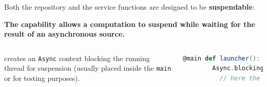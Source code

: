 \documentclass[aspectratio=1610,xcolor=dvipsnames,handout]{beamer}
\begin{document}
\begin{frame}[fragile] %
  \small
  Both the repository and the service functions are designed to be \textbf{suspendable}:
  \begin{block}{}
    \textbf{The  capability allows a computation to suspend while waiting for the result of an asynchronous source.}
  \end{block}
  
  \pause
  \begin{columns}
       creates an \texttt{Async} context blocking the running thread for suspension (usually placed inside the \texttt{main} or for testing purposes).
    \begin{lstlisting}[language=scala,gobble=6]
      @main def launcher(): Unit =
        Async.blocking:
          // here the Async capability is available
    \end{lstlisting}
  \end{columns}
\end{frame}
%
\end{document}
